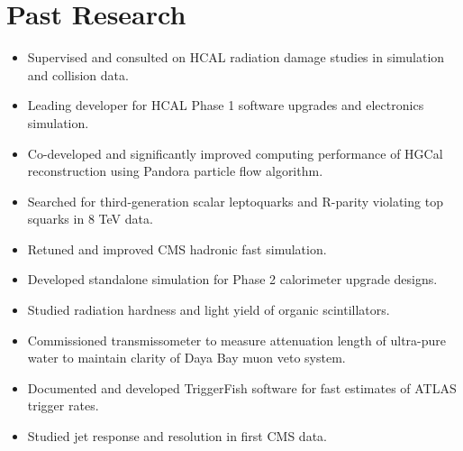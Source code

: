 \section{Past Research}
\begin{itemize}[leftmargin=12pt]
\item Supervised and consulted on HCAL radiation damage studies in simulation and collision data.
\item Leading developer for HCAL Phase 1 software upgrades and electronics simulation.
\item Co-developed and significantly improved computing performance of HGCal reconstruction using Pandora particle flow algorithm.
\item Searched for third-generation scalar leptoquarks and R-parity violating top squarks in 8 TeV data.
\item Retuned and improved CMS hadronic fast simulation.
\item Developed standalone simulation for Phase 2 calorimeter upgrade designs.
\item Studied radiation hardness and light yield of organic scintillators.
\item Commissioned transmissometer to measure attenuation length of ultra-pure water to maintain clarity of Daya Bay muon veto system.
\item Documented and developed TriggerFish software for fast estimates of ATLAS trigger rates.
\item Studied jet response and resolution in first CMS data.
\end{itemize}
